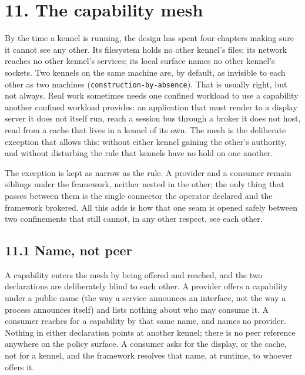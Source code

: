 \hypertarget{the-capability-mesh}{%
\chapter{11. The capability mesh}\label{the-capability-mesh}}

By the time a kennel is running, the design has spent four chapters
making sure it cannot see any other. Its filesystem holds no other
kennel's files; its network reaches no other kennel's services; its
local surface names no other kennel's sockets. Two kennels on the same
machine are, by default, as invisible to each other as two machines
(\texttt{construction-by-absence}). That is usually right, but not
always. Real work sometimes needs one confined workload to use a
capability another confined workload provides: an application that must
render to a display server it does not itself run, reach a session bus
through a broker it does not host, read from a cache that lives in a
kennel of its own. The mesh is the deliberate exception that allows
this: without either kennel gaining the other's authority, and without
disturbing the rule that kennels have no hold on one another.

The exception is kept as narrow as the rule. A provider and a consumer
remain siblings under the framework, neither nested in the other; the
only thing that passes between them is the single connector the operator
declared and the framework brokered. All this adds is how that one seam
is opened safely between two confinements that still cannot, in any
other respect, see each other.

\hypertarget{name-not-peer}{%
\section{11.1 Name, not peer}\label{name-not-peer}}

A capability enters the mesh by being offered and reached, and the two
declarations are deliberately blind to each other. A provider offers a
capability under a public name (the way a service announces an
interface, not the way a process announces itself) and lists nothing
about who may consume it. A consumer reaches for a capability by that
same name, and names no provider. Nothing in either declaration points
at another kennel; there is no peer reference anywhere on the policy
surface. A consumer asks for the display, or the cache, not for a
kennel, and the framework resolves that name, at runtime, to whoever
offers it.

